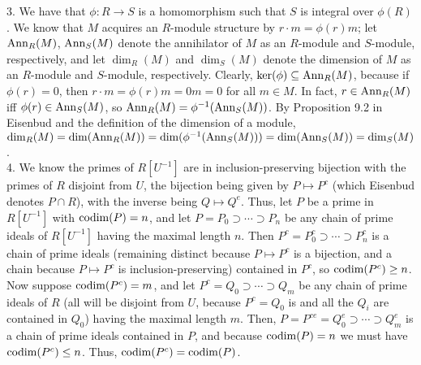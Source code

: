 \documentclass[11pt]{article}
\begin{document}
\num{3.} We have that $\phi:R\rightarrow S$ is a homomorphism such that $S$ is integral over $\phi(R)$. We know that $M$ acquires an $R$-module structure by $r\cdot m=\phi(r)m$; let $\operatorname{Ann}_R(M)$, $\operatorname{Ann}_S(M)$ denote the annihilator of $M$ as an $R$-module and $S$-module, respectively, and let $\dim_R(M)$ and $\dim_S(M)$ denote the dimension of $M$ as an $R$-module and $S$-module, respectively. Clearly, $\operatorname{ker}(\phi)\subseteq\operatorname{Ann}_R(M)$, because if $\phi(r)=0$, then $r\cdot m=\phi(r)m=0m=0$ for all $m\in M$. In fact, $r\in\operatorname{Ann}_R(M)$ iff $\phi(r)\in\operatorname{Ann}_S(M)$, so $\operatorname{Ann}_R(M)=\phi^{-1}(\operatorname{Ann}_S(M))$. By Proposition 9.2 in Eisenbud and the definition of the dimension of a module, $\operatorname{dim}_R(M)=\operatorname{dim}(\operatorname{Ann}_R(M))=\operatorname{dim}(\phi^{-1}(\operatorname{Ann}_S(M)))=\operatorname{dim}(\operatorname{Ann}_S(M))=\operatorname{dim}_S(M)$.    \\

\num{4.} We know the primes of $R[U^{-1}]$ are in inclusion-preserving bijection with the primes of $R$ disjoint from $U$, the bijection being given by $P\mapsto P^c$ (which Eisenbud denotes $P\cap R$), with the inverse being $Q\mapsto Q^e$. Thus, let $P$ be a prime in $R[U^{-1}]$ with $\operatorname{codim}(P)=n$, and let $P=P_0\supset\cdots\supset P_n$ be any chain of prime ideals of $R[U^{-1}]$ having the maximal length $n$. Then $P^c=P_0^c\supset\cdots\supset P_n^c$ is a chain of prime ideals (remaining distinct because $P\mapsto P^c$ is a bijection, and a chain because $P\mapsto P^c$ is inclusion-preserving) contained in $P^c$, so $\operatorname{codim}(P^c)\geq n$. Now suppose $\operatorname{codim}(P^c)=m$, and let $P^c=Q_0\supset\cdots\supset Q_m$ be any chain of prime ideals of $R$ (all will be disjoint from $U$, because $P^c=Q_0$ is and all the $Q_i$ are contained in $Q_0$) having the maximal length $m$. Then, $P=P^{ce}=Q_0^e\supset\cdots\supset Q_m^e$ is a chain of prime ideals contained in $P$, and because $\operatorname{codim}(P)=n$ we must have $\operatorname{codim}(P^c)\leq n$. Thus, $\operatorname{codim}(P^c)=\operatorname{codim}(P)$.    \\
\end{document}
